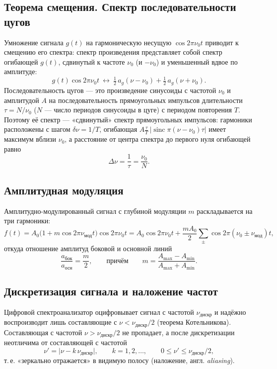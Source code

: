 \documentclass[a4paper,12pt]{article}
\begin{document}
\subsection{Теорема смещения. Спектр последовательности цугов}
Умножение сигнала $g(t)$ на гармоническую несущую $\cos 2\pi\nu_0 t$ приводит
к смещению его спектра: спектр произведения представляет собой спектр
огибающей $g(t)$, сдвинутый к частоте $\nu_0$ (и $-\nu_0$) и уменьшенный вдвое
по амплитуде:
\begin{equation}
    \label{eq:shift}
    g(t)\cos 2\pi\nu_0 t
    \ \longleftrightarrow\
    \tfrac12\, a_g(\nu-\nu_0) + \tfrac12\, a_g(\nu+\nu_0).
\end{equation}
Последовательность цугов --- это произведение синусоиды с частотой
$\nu_0$ и амплитудой $A$ на последовательность прямоугольных импульсов
длительности $\tau = N/\nu_0$ ($N$ --- число периодов синусоиды в цуге) с
периодом повторения $T$. Поэтому её спектр --- «сдвинутый» спектр
прямоугольных импульсов: гармоники расположены с шагом $\delta\nu = 1/T$,
огибающая $A\frac{\tau}{T}\,|\operatorname{sinc}\pi(\nu-\nu_0)\tau|$ имеет
максимум вблизи $\nu_0$, а расстояние от центра спектра до первого нуля
огибающей равно
\begin{equation}
    \label{eq:burst_width}
    \Delta\nu = \frac{1}{\tau} = \frac{\nu_0}{N}.
\end{equation}

\subsection{Амплитудная модуляция}
Амплитудно-модулированный сигнал с глубиной модуляции $m$ раскладывается на
три гармоники:
\begin{equation}
    \label{eq:am}
    f(t) = A_0\bigl(1 + m\cos 2\pi\nu_{\text{мод}}t\bigr)\cos 2\pi\nu_0 t
    = A_0\cos 2\pi\nu_0 t
    + \frac{mA_0}{2}\sum_{\pm}\cos 2\pi(\nu_0\pm\nu_{\text{мод}})t,
\end{equation}
откуда отношение амплитуд боковой и основной линий
\begin{equation}
    \label{eq:am_ratio}
    \frac{a_{\text{бок}}}{a_{\text{осн}}} = \frac{m}{2},
    \qquad\text{причём}\qquad
    m = \frac{A_{\max}-A_{\min}}{A_{\max}+A_{\min}}.
\end{equation}

\subsection{Дискретизация сигнала и наложение частот}
Цифровой спектроанализатор оцифровывает сигнал с частотой
$\nu_{\text{дискр}}$ и надёжно воспроизводит лишь составляющие с
$\nu < \nu_{\text{дискр}}/2$ (теорема Котельникова). Составляющая с
частотой $\nu > \nu_{\text{дискр}}/2$ не пропадает, а после дискретизации
неотличима от составляющей с частотой
\begin{equation}
    \label{eq:alias}
    \nu' = \bigl|\nu - k\,\nu_{\text{дискр}}\bigr|,
    \qquad k = 1, 2, \dots,
    \qquad 0 \leqslant \nu' \leqslant \nu_{\text{дискр}}/2,
\end{equation}
т.\,е. «зеркально отражается» в видимую полосу (наложение, англ.
\emph{aliasing}).
\end{document}
